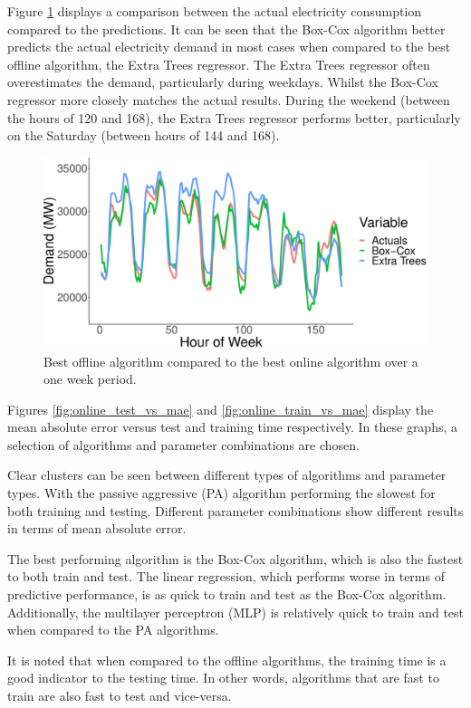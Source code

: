 \documentclass[final,3p,times,twocolumn,numbers]{elsarticle}
\begin{document}
Figure \ref{fig:both_actual_predicted} displays a comparison between the actual electricity consumption compared to the predictions. It can be seen that the Box-Cox algorithm better predicts the actual electricity demand in most cases when compared to the best offline algorithm, the Extra Trees regressor. The Extra Trees regressor often overestimates the demand, particularly during weekdays. Whilst the Box-Cox regressor more closely matches the actual results. During the weekend (between the hours of 120 and 168), the Extra Trees regressor performs better, particularly on the Saturday (between hours of 144 and 168). 


\begin{figure}[h]
\centering
\includegraphics[width=0.8\columnwidth]{figures/results/both_actual_predicted.eps}
\caption{Best offline algorithm compared to the best online algorithm over a one week period.}
\label{fig:both_actual_predicted}
\end{figure}

Figures \ref{fig:online_test_vs_mae} and \ref{fig:online_train_vs_mae} display the mean absolute error versus test and training time respectively. In these graphs, a selection of algorithms and parameter combinations are chosen. 

Clear clusters can be seen between different types of algorithms and parameter types. With the passive aggressive (PA) algorithm performing the slowest for both training and testing. Different parameter combinations show different results in terms of mean absolute error.

The best performing algorithm is the Box-Cox algorithm, which is also the fastest to both train and test. The linear regression, which performs worse in terms of predictive performance, is as quick to train and test as the Box-Cox algorithm. Additionally, the multilayer perceptron (MLP) is relatively quick to train and test when compared to the PA algorithms. 

It is noted that when compared to the offline algorithms, the training time is a good indicator to the testing time. In other words, algorithms that are fast to train are also fast to test and vice-versa.
\end{document}
